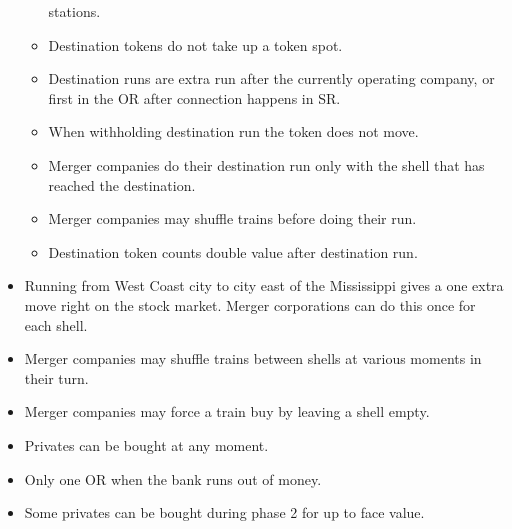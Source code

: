 \documentclass[a4paper,twocolumn]{article}
\begin{document}
\begin{itemize}
\begin{itemize}
		stations.
		\item Destination tokens do not take up a token spot.
		\item Destination runs are extra run after the currently operating
		company, or first in the OR after connection happens in SR.
		\item When withholding destination run the token does not move.
		\item Merger companies do their destination run only with the shell that
		has reached the destination.
		\item Merger companies may shuffle trains before doing their run.
		\item Destination token counts double value after destination run.
	\end{itemize}
	\item Running from West Coast city to city east of the Mississippi gives
	a one extra move right on the stock market. Merger corporations can do this
	once for each shell.
	\item Merger companies may shuffle trains between shells at various moments
	in their turn.
	\item Merger companies may force a train buy by leaving a shell empty.
	\item Privates can be bought at any moment.
	\item Only one OR when the bank runs out of money.
	\item Some privates can be bought during phase 2 for up to face value.
\end{itemize}
	
\end{document}
